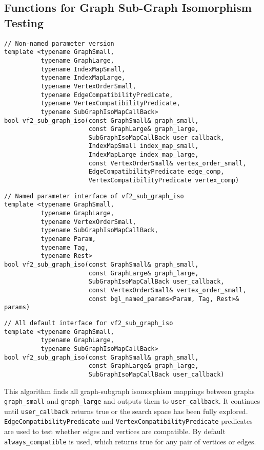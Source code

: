 \documentclass[12pt]{article}
\begin{document}
\subsection{Functions for Graph Sub-Graph Isomorphism Testing}

\begin{lstlisting}
// Non-named parameter version
template <typename GraphSmall,
          typename GraphLarge,
          typename IndexMapSmall,
          typename IndexMapLarge,
          typename VertexOrderSmall,
          typename EdgeCompatibilityPredicate,
          typename VertexCompatibilityPredicate,
          typename SubGraphIsoMapCallBack>
bool vf2_sub_graph_iso(const GraphSmall& graph_small,
                       const GraphLarge& graph_large,
                       SubGraphIsoMapCallBack user_callback,
                       IndexMapSmall index_map_small,
                       IndexMapLarge index_map_large, 
                       const VertexOrderSmall& vertex_order_small,
                       EdgeCompatibilityPredicate edge_comp,
                       VertexCompatibilityPredicate vertex_comp)
\end{lstlisting}


\begin{lstlisting}
// Named parameter interface of vf2_sub_graph_iso
template <typename GraphSmall,
          typename GraphLarge,
          typename VertexOrderSmall,
          typename SubGraphIsoMapCallBack,
          typename Param,
          typename Tag,
          typename Rest>
bool vf2_sub_graph_iso(const GraphSmall& graph_small,
                       const GraphLarge& graph_large,
                       SubGraphIsoMapCallBack user_callback,
                       const VertexOrderSmall& vertex_order_small,
                       const bgl_named_params<Param, Tag, Rest>& params)
\end{lstlisting}


\begin{lstlisting}
// All default interface for vf2_sub_graph_iso
template <typename GraphSmall,
          typename GraphLarge,
          typename SubGraphIsoMapCallBack>
bool vf2_sub_graph_iso(const GraphSmall& graph_small,
                       const GraphLarge& graph_large, 
                       SubGraphIsoMapCallBack user_callback)
\end{lstlisting}

This algorithm finds all graph-subgraph isomorphism mappings between graphs
\verb+graph_small+ and \verb+graph_large+ and outputs them to \verb+user_callback+.
It continues until \verb+user_callback+ returns true or the search space has
been fully explored.\\
\verb+EdgeCompatibilityPredicate+ and \verb+VertexCompatibilityPredicate+
predicates are used to test whether edges and vertices are compatible.
By default \verb+always_compatible+ is used, which returns true for any pair of
vertices or edges.
\end{document}
